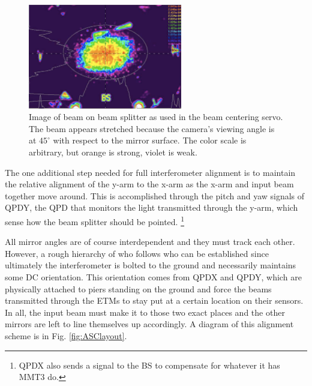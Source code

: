 \begin{figure} 
\begin{centering} \includegraphics[width=0.6\textwidth]{figures/BCSspiricon.pdf} 
\caption[Beam centering servo image of beam splitter]{Image of beam on beam splitter as used in the beam centering servo. The beam appears stretched because the camera's viewing angle is at $45^{\circ}$ with respect to the mirror surface. The color scale is arbitrary, but orange is strong, violet is weak.}
\label{fig:BCS}
\end{centering}
\end{figure}

The one additional step needed for full interferometer alignment is to maintain the relative alignment of the y-arm to the x-arm as the x-arm and input beam together move around. This is accomplished through the pitch and yaw signals of QPDY, the QPD that monitors the light transmitted through the y-arm, which sense how the beam splitter should be pointed. \footnote{QPDX also sends a signal to the BS to compensate for whatever it has MMT3 do.}

All mirror angles are of course interdependent and they must track each other. However, a rough hierarchy of who follows who can be established since ultimately the interferometer is bolted to the ground and necessarily maintains some DC orientation. This orientation comes from QPDX and QPDY, which are physically attached to piers standing on the ground and force the beams transmitted through the ETMs to stay put at a certain location on their sensors. In all, the input beam must make it to those two exact places and the other mirrors are left to line themselves up accordingly. A diagram of this alignment scheme is in Fig. \ref{fig:ASClayout}.


